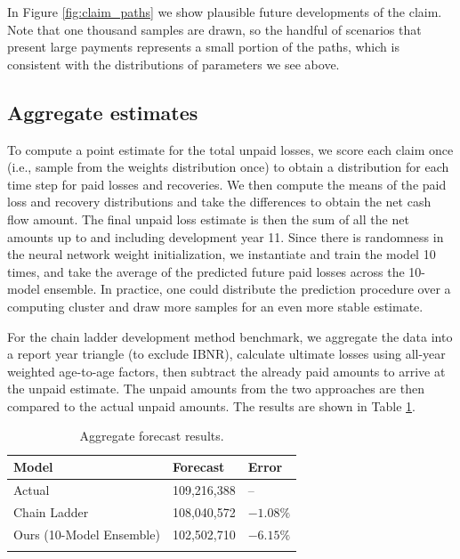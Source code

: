 \documentclass{article}
\begin{document}
In Figure \ref{fig:claim_paths} we show plausible future developments of the
claim. Note that one thousand samples are drawn, so the handful of scenarios that
present large payments represents a small portion of the paths, which is 
consistent with the distributions of parameters we see above.

\subsection{Aggregate estimates}

To compute a point estimate for the total unpaid losses, we score each claim 
once (i.e., sample from the weights distribution once) to obtain a distribution 
for each time step for paid losses and recoveries. We then compute the means of
the paid loss and recovery distributions and take the differences to obtain the 
net cash flow amount. The final unpaid loss estimate is then the sum of all the 
net amounts up to and including development year 11. Since there is randomness 
in the neural network weight initialization, we instantiate and train the model
10 times, and take the average of the predicted future paid losses across the 
10-model ensemble. In practice, one could distribute the prediction procedure 
over a computing cluster and draw more samples for an even more stable estimate.

For the chain ladder development method benchmark, we aggregate the data into a 
report year triangle (to exclude IBNR), calculate ultimate losses using all-year
weighted age-to-age factors, then subtract the already paid amounts to arrive at
the unpaid estimate. The unpaid amounts from the two approaches are then 
compared to the actual unpaid amounts. The results are shown in Table
\ref{table:results}.

\begin{table}[ht]
\centering
\begin{tabular}[t]{lll}
\toprule
Model & Forecast & Error\\
\midrule
Actual                                & 109,216,388  & --\\
Chain Ladder                          & 108,040,572  & $-1.08\%$\\
Ours (10-Model Ensemble)              & 102,502,710  & $-6.15\%$\\
\bottomrule\\[1ex]
\end{tabular}
\caption{Aggregate forecast results.}
\label{table:results}
\end{table}%
\end{document}
